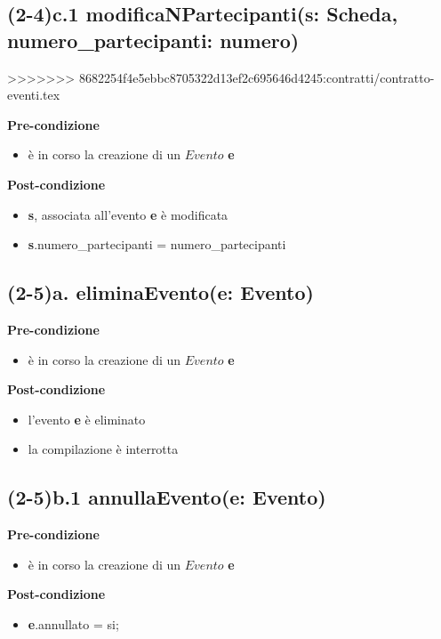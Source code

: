 \documentclass[12pt]{extarticle}
\begin{document}
\subsection*{(2-4)c.1 modificaNPartecipanti(s: Scheda, numero\_partecipanti: numero)}
>>>>>>> 8682254f4e5ebbc8705322d13ef2c695646d4245:contratti/contratto-eventi.tex

\textbf{Pre-condizione}
\begin{itemize}
  \item è in corso la creazione di un $Evento$ \textbf{e}
\end{itemize} 
\textbf{Post-condizione}
\begin{itemize}
  \item \textbf{s}, associata all'evento \textbf{e} è modificata
  \item \textbf{s}.numero\_partecipanti = numero\_partecipanti
\end{itemize}

\subsection*{(2-5)a. eliminaEvento(e: Evento)}

\textbf{Pre-condizione}
\begin{itemize}
  \item è in corso la creazione di un $Evento$ \textbf{e}
\end{itemize}
\textbf{Post-condizione}
\begin{itemize}
  \item l'evento \textbf{e} è eliminato
  \item la compilazione è interrotta
\end{itemize}  


\subsection*{(2-5)b.1 annullaEvento(e: Evento)}

\textbf{Pre-condizione}
\begin{itemize}
  \item è in corso la creazione di un $Evento$ \textbf{e}
\end{itemize}
\textbf{Post-condizione}
\begin{itemize}
  \item \textbf{e}.annullato = si;
\end{itemize}  
\end{document}
